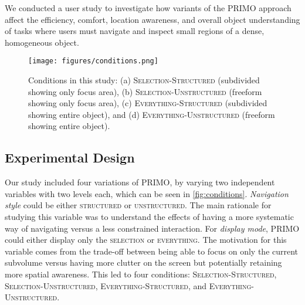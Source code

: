 We conducted a user study to investigate how variants of the PRIMO approach affect the efficiency, comfort, location awareness, and overall object understanding of tasks where users must navigate and inspect small regions of a dense, homogeneous object.

\begin{figure}[tb]
 \centering
 \texttt{[image: figures/conditions.png]}
 \caption{Conditions in this study: (a) \textsc{Selection-Structured} (subdivided showing only focus area), (b) \textsc{Selection-Unstructured} (freeform showing only focus area), (c) \textsc{Everything-Structured} (subdivided showing entire object), and (d) \textsc{Everything-Unstructured} (freeform showing entire object).}
 \label{fig:conditions}
 \vspace{-4mm}
\end{figure}

\subsection{Experimental Design}
Our study included four variations of PRIMO, by varying two independent variables with two levels each, which can be seen in \autoref{fig:conditions}. \textit{Navigation style} could be either \textsc{structured} or \textsc{unstructured}. The main rationale for studying this variable was to understand the effects of having a more systematic way of navigating versus a less constrained interaction. For \textit{display mode}, PRIMO could either display only the \textsc{selection} or \textsc{everything}. The motivation for this variable comes from the trade-off between being able to focus on only the current subvolume versus having more clutter on the screen but potentially retaining more spatial awareness. This led to four conditions: \textsc{Selection-Structured}, \textsc{Selection-Unstructured}, \textsc{Everything-Structured}, and \textsc{Everything-Unstructured}.




